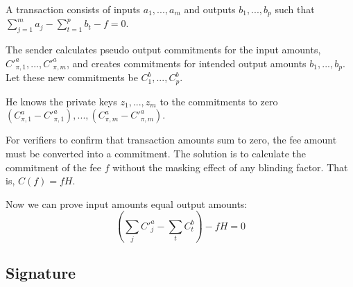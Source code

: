 A transaction consists of inputs \(a_1, ..., a_m\) and outputs \(b_1, ..., b_p\) such that \(\sum\limits_{j=1}^m a_j - \sum\limits_{t=1}^{p} b_t - f = 0\).

The sender calculates pseudo output commitments for the input amounts, $C'^a_{\pi,1}, ..., C'^a_{\pi,m}$, and creates commitments for intended output amounts $b_1, ..., b_p$. Let these new commitments be $C^b_1, ..., C^b_p$.

He knows the private keys $z_1,...,z_m$ to the commitments to zero $(C^a_{\pi,1} - C'^a_{\pi,1}),...,(C^a_{\pi,m} - C'^a_{\pi,m})$.

For verifiers to confirm that transaction amounts sum to zero, the fee amount must be converted into a commitment. The solution is to calculate the commitment of the fee $f$ without the masking effect of any blinding factor. That is, $C(f) = f H$.

Now we can prove input amounts equal output amounts:\\
\[(\sum_j C'^a_{j} - \sum_t C^b_{t}) - f H = 0\]


\subsection{Signature}
\label{subsec:ringct-full-signature}

